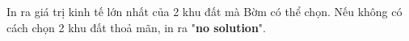 In ra giá trị kinh tế lớn nhất của 2 khu đất mà Bờm có thể chọn. Nếu không có cách chọn 2 khu đất thoả mãn, in ra "\textbf{no solution}".